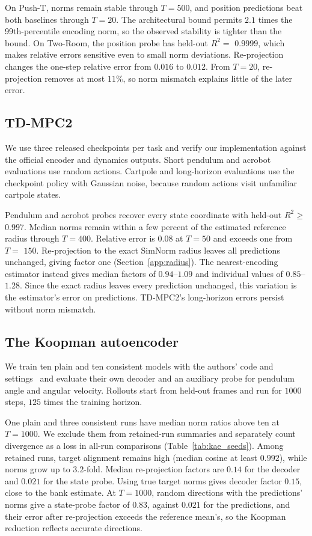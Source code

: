 On Push-T, norms remain stable through $T=500$, and position predictions beat both baselines through $T=20$. The architectural bound permits $2.1$ times the 99th-percentile encoding norm, so the observed stability is tighter than the bound. On Two-Room, the position probe has held-out $R^2=$ $0.9999$, which makes relative errors sensitive even to small norm deviations. Re-projection changes the one-step relative error from $0.016$ to $0.012$. From $T=20$, re-projection removes at most $11$\%, so norm mismatch explains little of the later error.

\subsection{TD-MPC2}
\label{app:tdmpc2}
We use three released checkpoints per task and verify our implementation against the official encoder and dynamics outputs. Short pendulum and acrobot evaluations use random actions. Cartpole and long-horizon evaluations use the checkpoint policy with Gaussian noise, because random actions visit unfamiliar cartpole states.

Pendulum and acrobot probes recover every state coordinate with held-out $R^2\ge$ $0.997$. Median norms remain within a few percent of the estimated reference radius through $T=400$. Relative error is $0.08$ at $T=50$ and exceeds one from $T=$ $150$. Re-projection to the exact SimNorm radius leaves all predictions unchanged, giving factor one (Section~\ref{app:radius}). The nearest-encoding estimator instead gives median factors of $0.94$--$1.09$ and individual values of $0.85$--$1.28$. Since the exact radius leaves every prediction unchanged, this variation is the estimator's error on predictions. TD-MPC2's long-horizon errors persist without norm mismatch.

\subsection{The Koopman autoencoder}
\label{app:kae}
We train ten plain and ten consistent models with the authors' code and settings~\citep{Azencot2020} and evaluate their own decoder and an auxiliary probe for pendulum angle and angular velocity. Rollouts start from held-out frames and run for $1000$ steps, $125$ times the training horizon.

One plain and three consistent runs have median norm ratios above ten at $T=1000$. We exclude them from retained-run summaries and separately count divergence as a loss in all-run comparisons (Table~\ref{tab:kae_seeds}). Among retained runs, target alignment remains high (median cosine at least $0.992$), while norms grow up to $3.2$-fold. Median re-projection factors are $0.14$ for the decoder and $0.021$ for the state probe. Using true target norms gives decoder factor $0.15$, close to the bank estimate. At $T=1000$, random directions with the predictions' norms give a state-probe factor of $0.83$, against $0.021$ for the predictions, and their error after re-projection exceeds the reference mean's, so the Koopman reduction reflects accurate directions.

